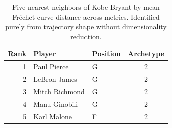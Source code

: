 \begin{table}[htbp]
  \centering\small
  \begin{tabular}{rllc}
    \toprule
    Rank & Player & Position & Archetype \\
    \midrule
    1 & Paul Pierce & G & 2 \\
    2 & LeBron James & G & 2 \\
    3 & Mitch Richmond & G & 2 \\
    4 & Manu Ginobili & G & 2 \\
    5 & Karl Malone & F & 2 \\
    \bottomrule
  \end{tabular}
  \caption{Five nearest neighbors of Kobe Bryant by mean Fr\'{e}chet curve distance across metrics. Identified purely from trajectory shape without dimensionality reduction.}
  \label{tab:Kobe_Bryant_frechet_curve_neighbors}
\end{table}

